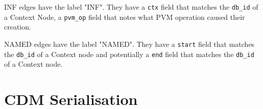 \documentclass[12pt,twoside,a4paper]{article}
\newcommand{\field}[1]{\texttt{#1}}
\begin{document}
INF edges have the label "INF". They have a \field{ctx} field that matches the \field{db\_id} of a Context Node, a \field{pvm\_op} field that notes what PVM operation caused their creation.

NAMED edges have the label "NAMED". They have a \field{start} field that matches the \field{db\_id} of a Context node and potentially a \field{end}
 field that matches the \field{db\_id} of a Context node.

\section{CDM Serialisation}
\label{app:enc:cdm}
\end{document}
